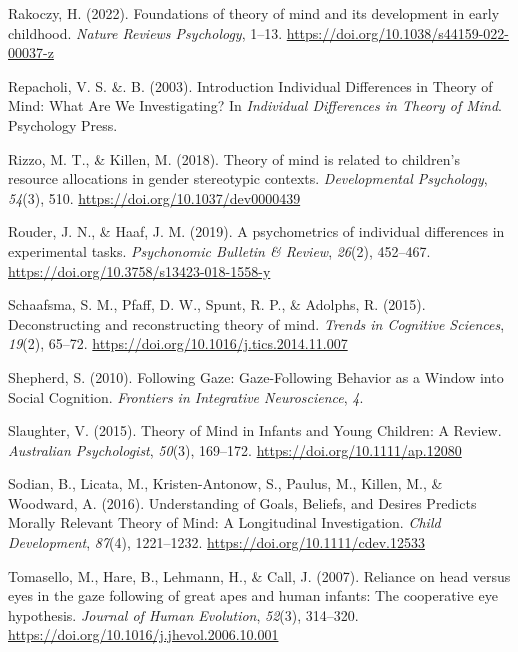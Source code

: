 \documentclass[
  man,floatsintext]{apa6}
\newlength{\cslhangindent}
\newlength{\cslentryspacingunit} %
\newenvironment{CSLReferences}[2] %
 {%
  \setlength{\parindent}{0pt}
  \ifodd #1
  \let\oldpar\par
  \def\par{\hangindent=\cslhangindent\oldpar}
  \fi
  \setlength{\parskip}{#2\cslentryspacingunit}
 }%
 {}
\begin{document}
\begin{CSLReferences}{1}{0}
\leavevmode{}%
Rakoczy, H. (2022). Foundations of theory of mind and its development in early childhood. \emph{Nature Reviews Psychology}, 1--13. \url{https://doi.org/10.1038/s44159-022-00037-z}

\leavevmode{}%
Repacholi, V. S. \&. B. (2003). Introduction {Individual Differences} in {Theory} of {Mind}: {What Are We Investigating}? In \emph{Individual {Differences} in {Theory} of {Mind}}. {Psychology Press}.

\leavevmode{}%
Rizzo, M. T., \& Killen, M. (2018). Theory of mind is related to children's resource allocations in gender stereotypic contexts. \emph{Developmental Psychology}, \emph{54}(3), 510. \url{https://doi.org/10.1037/dev0000439}

\leavevmode{}%
Rouder, J. N., \& Haaf, J. M. (2019). A psychometrics of individual differences in experimental tasks. \emph{Psychonomic Bulletin \& Review}, \emph{26}(2), 452--467. \url{https://doi.org/10.3758/s13423-018-1558-y}

\leavevmode{}%
Schaafsma, S. M., Pfaff, D. W., Spunt, R. P., \& Adolphs, R. (2015). Deconstructing and reconstructing theory of mind. \emph{Trends in Cognitive Sciences}, \emph{19}(2), 65--72. \url{https://doi.org/10.1016/j.tics.2014.11.007}

\leavevmode{}%
Shepherd, S. (2010). Following {Gaze}: {Gaze-Following Behavior} as a {Window} into {Social Cognition}. \emph{Frontiers in Integrative Neuroscience}, \emph{4}.

\leavevmode{}%
Slaughter, V. (2015). Theory of {Mind} in {Infants} and {Young Children}: {A Review}. \emph{Australian Psychologist}, \emph{50}(3), 169--172. \url{https://doi.org/10.1111/ap.12080}

\leavevmode{}%
Sodian, B., Licata, M., Kristen-Antonow, S., Paulus, M., Killen, M., \& Woodward, A. (2016). Understanding of {Goals}, {Beliefs}, and {Desires Predicts Morally Relevant Theory} of {Mind}: {A Longitudinal Investigation}. \emph{Child Development}, \emph{87}(4), 1221--1232. \url{https://doi.org/10.1111/cdev.12533}

\leavevmode{}%
Tomasello, M., Hare, B., Lehmann, H., \& Call, J. (2007). Reliance on head versus eyes in the gaze following of great apes and human infants: The cooperative eye hypothesis. \emph{Journal of Human Evolution}, \emph{52}(3), 314--320. \url{https://doi.org/10.1016/j.jhevol.2006.10.001}


\end{CSLReferences}
\end{document}
